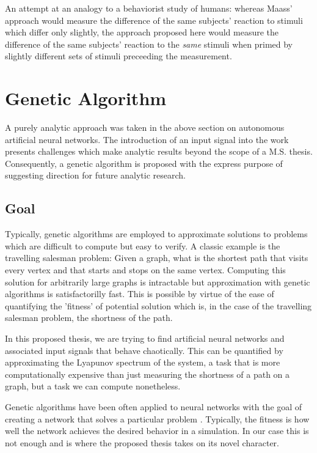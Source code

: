 \documentclass[12pt]{article}
\begin{document}
An attempt
at an analogy to a behaviorist study of humans:  whereas Maass' 
approach would measure the difference of the same subjects' reaction to 
stimuli which differ only slightly, the approach proposed here would measure
the difference of the same subjects' reaction to the \textit{same} stimuli
when primed by slightly different sets of stimuli preceeding the measurement.

\section{Genetic Algorithm}
A purely analytic approach was taken in the above section on autonomous 
artificial neural networks.  The introduction of an input signal into the
work presents challenges which make analytic results beyond the scope of a
M.S. thesis.  Consequently, a genetic algorithm is proposed with
the express purpose of suggesting direction for future analytic research.

\subsection{Goal}
Typically, genetic algorithms are employed to approximate solutions to problems
which are difficult to compute but easy to verify.  A classic example is the
travelling salesman problem:  Given a graph, what is the shortest path that
visits every vertex and that starts and stops on the same vertex.  Computing
this solution for arbitrarily large graphs is intractable but approximation
with genetic algorithms is satisfactorilly fast.  This is possible by 
virtue of the
ease of quantifying the 'fitness' of potential solution which is, in the case 
of the travelling salesman problem, the shortness of the path.

In this proposed thesis, we are trying to find artificial neural networks
and associated input signals that behave chaotically.  This can be quantified
by approximating the Lyapunov spectrum of the system, a task that is more 
computationally expensive than just measuring the shortness of a path on a
graph, but a task we can compute nonetheless.

Genetic algorithms have been often applied to neural networks with the goal
of creating a network that solves a particular problem \cite{doya}.
Typically, the fitness is how well the network achieves the desired behavior
in a simulation.  In our case this is not enough and is where the proposed
thesis takes on its novel character.
\end{document}
